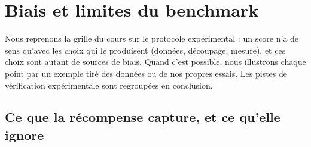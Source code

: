 \section{Biais et limites du benchmark}
\label{sec:biais}

Nous reprenons la grille du cours sur le protocole expérimental : un score n'a de sens qu'avec les choix qui le produisent (données, découpage, mesure), et ces choix sont autant de sources de biais. Quand c'est possible, nous illustrons chaque point par un exemple tiré des données ou de nos propres essais. Les pistes de vérification expérimentale sont regroupées en conclusion.

\subsection{Ce que la récompense capture, et ce qu'elle ignore}
